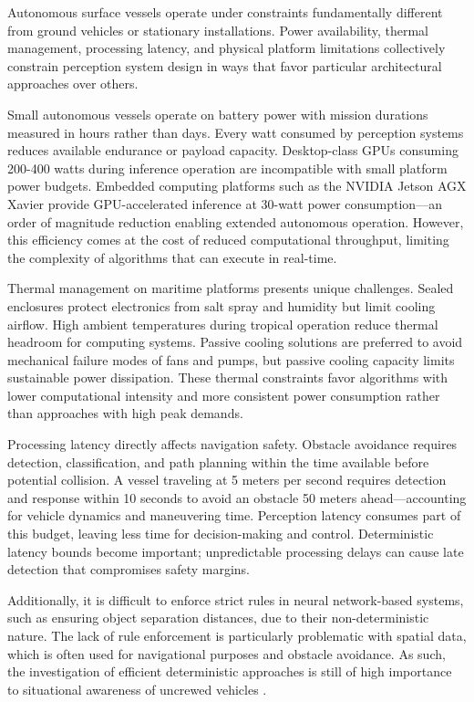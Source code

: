 \documentclass[../main.tex]{subfiles}
\begin{document}
Autonomous surface vessels operate under constraints fundamentally different from ground vehicles or stationary installations. Power availability, thermal management, processing latency, and physical platform limitations collectively constrain perception system design in ways that favor particular architectural approaches over others.

Small autonomous vessels operate on battery power with mission durations measured in hours rather than days. Every watt consumed by perception systems reduces available endurance or payload capacity. Desktop-class GPUs consuming 200-400 watts during inference operation are incompatible with small platform power budgets. Embedded computing platforms such as the NVIDIA Jetson AGX Xavier provide GPU-accelerated inference at 30-watt power consumption—an order of magnitude reduction enabling extended autonomous operation. However, this efficiency comes at the cost of reduced computational throughput, limiting the complexity of algorithms that can execute in real-time.

Thermal management on maritime platforms presents unique challenges. Sealed enclosures protect electronics from salt spray and humidity but limit cooling airflow. High ambient temperatures during tropical operation reduce thermal headroom for computing systems. Passive cooling solutions are preferred to avoid mechanical failure modes of fans and pumps, but passive cooling capacity limits sustainable power dissipation. These thermal constraints favor algorithms with lower computational intensity and more consistent power consumption rather than approaches with high peak demands.

Processing latency directly affects navigation safety. Obstacle avoidance requires detection, classification, and path planning within the time available before potential collision. A vessel traveling at 5 meters per second requires detection and response within 10 seconds to avoid an obstacle 50 meters ahead—accounting for vehicle dynamics and maneuvering time. Perception latency consumes part of this budget, leaving less time for decision-making and control. Deterministic latency bounds become important; unpredictable processing delays can cause late detection that compromises safety margins.

Additionally, it is difficult to enforce strict rules in neural network-based systems, such as ensuring object separation distances, due to their non-deterministic nature. The lack of rule enforcement is particularly problematic with spatial data, which is often used for navigational purposes and obstacle avoidance. As such, the investigation of efficient deterministic approaches is still of high importance to situational awareness of uncrewed vehicles \cite{coyleE}.
\end{document}
